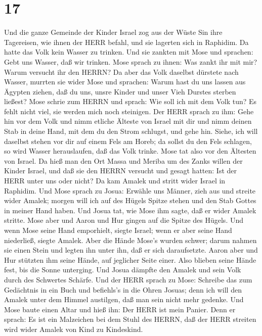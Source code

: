 \hypertarget{section-16}{%
\section{17}\label{section-16}}

 Und die ganze Gemeinde der Kinder Israel zog aus der Wüste
Sin ihre Tagereisen, wie ihnen der HERR befahl, und sie lagerten sich in
Raphidim. Da hatte das Volk kein Wasser zu trinken.  Und sie
zankten mit Mose und sprachen: Gebt uns Wasser, daß wir trinken. Mose
sprach zu ihnen: Was zankt ihr mit mir? Warum versucht ihr den HERRN?
 Da aber das Volk daselbst dürstete nach Wasser, murrten sie
wider Mose und sprachen: Warum hast du uns lassen aus Ägypten ziehen,
daß du uns, unsre Kinder und unser Vieh Durstes sterben ließest?
 Mose schrie zum HERRN und sprach: Wie soll ich mit dem Volk
tun? Es fehlt nicht viel, sie werden mich noch steinigen. 
Der HERR sprach zu ihm: Gehe hin vor dem Volk und nimm etliche Älteste
von Israel mit dir und nimm deinen Stab in deine Hand, mit dem du den
Strom schlugst, und gehe hin.  Siehe, ich will daselbst
stehen vor dir auf einem Fels am Horeb; da sollst du den Fels schlagen,
so wird Wasser herauslaufen, daß das Volk trinke. Mose tat also vor den
Ältesten von Israel.  Da hieß man den Ort Massa und Meriba
um des Zanks willen der Kinder Israel, und daß sie den HERRN versucht
und gesagt hatten: Ist der HERR unter uns oder nicht?  Da
kam Amalek und stritt wider Israel in Raphidim.  Und Mose
sprach zu Josua: Erwähle uns Männer, zieh aus und streite wider Amalek;
morgen will ich auf des Hügels Spitze stehen und den Stab Gottes in
meiner Hand haben.  Und Josua tat, wie Mose ihm sagte, daß
er wider Amalek stritte. Mose aber und Aaron und Hur gingen auf die
Spitze des Hügels.  Und wenn Mose seine Hand emporhielt,
siegte Israel; wenn er aber seine Hand niederließ, siegte Amalek.
 Aber die Hände Mose's wurden schwer; darum nahmen sie
einen Stein und legten ihn unter ihn, daß er sich daraufsetzte. Aaron
aber und Hur stützten ihm seine Hände, auf jeglicher Seite einer. Also
blieben seine Hände fest, bis die Sonne unterging.  Und
Josua dämpfte den Amalek und sein Volk durch des Schwertes Schärfe.
 Und der HERR sprach zu Mose: Schreibe das zum Gedächtnis
in ein Buch und befiehls's in die Ohren Josuas; denn ich will den Amalek
unter dem Himmel austilgen, daß man sein nicht mehr gedenke.
 Und Mose baute einen Altar und hieß ihn: Der HERR ist mein
Panier.  Denn er sprach: Es ist ein Malzeichen bei dem
Stuhl des HERRN, daß der HERR streiten wird wider Amalek von Kind zu
Kindeskind.

